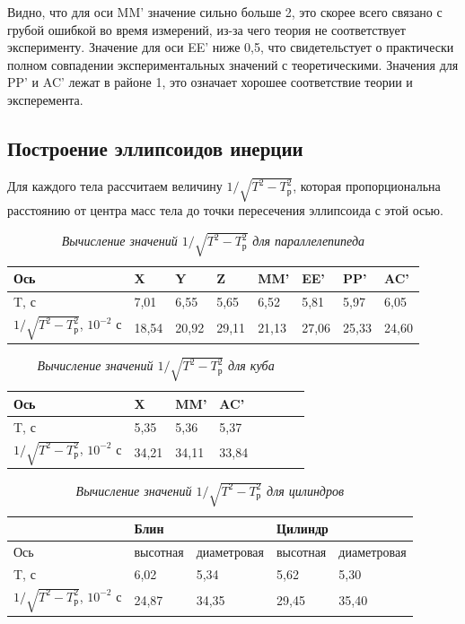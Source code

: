\documentclass[a4paper,12pt]{article}
\begin{document}
Видно, что для оси MM' значение сильно больше 2, это скорее всего связано с грубой ошибкой во время измерений, из-за чего теория не соответствует эксперименту. Значение для оси EE' ниже 0,5, что свидетельстует о практически полном совпадении экспериментальных значений с теоретическими. Значения для PP' и AC' лежат в районе 1, это означает хорошее соответствие теории и эксперемента.

\subsection{Построение эллипсоидов инерции}

Для каждого тела рассчитаем величину $1 / \sqrt{T^2 - T^2_\text{р}}$, которая пропорциональна расстоянию от центра масс тела до точки пересечения эллипсоида с этой осью.

\begin{table}[!ht]
    \centering
    \begin{tabular}{|l|l|l|l|l|l|l|l|}
    \hline
        Ось & X & Y & Z & MM’ & EE’ & PP’ & AC’ \\ \hline
        T, с & 7,01 & 6,55 & 5,65 & 6,52 & 5,81 & 5,97 & 6,05 \\ \hline
        $1 / \sqrt{T^2 - T^2_\text{р}}$, $10^{-2} \text{ с}$ & 18,54 & 20,92 & 29,11 & 21,13 & 27,06 & 25,33 & 24,60 \\ \hline
    \end{tabular}\caption{\textit{Вычисление значений $1 / \sqrt{T^2 - T^2_\text{р}}$ для параллелепипеда}}
\end{table}

\begin{table}[!ht]
    \centering
    \begin{tabular}{|l|l|l|l|l|l|l|l|}
    \hline
        Ось & X & MM’ & AC’ \\ \hline
        T, с & 5,35 & 5,36 & 5,37 \\ \hline
        $1 / \sqrt{T^2 - T^2_\text{р}}$, $10^{-2} \text{ с}$ & 34,21 & 34,11 & 33,84 \\ \hline
    \end{tabular}\caption{\textit{Вычисление значений $1 / \sqrt{T^2 - T^2_\text{р}}$ для куба}}
\end{table}

\begin{table}[!ht]
    \centering
    \begin{tabular}{|l|l|l|l|l|}
    \hline
        ~ & \multicolumn{2}{l|}{Блин} & \multicolumn{2}{l|}{Цилиндр} \\ \hline
        Ось & высотная & диаметровая & высотная & диаметровая \\ \hline
        T, с & 6,02 & 5,34 & 5,62 & 5,30 \\ \hline
        $1 / \sqrt{T^2 - T^2_\text{р}}$, $10^{-2} \text{ с}$ & 24,87 & 34,35 & 29,45 & 35,40 \\ \hline
    \end{tabular}\caption{\textit{Вычисление значений $1 / \sqrt{T^2 - T^2_\text{р}}$ для цилиндров}}
\end{table}
\end{document}
